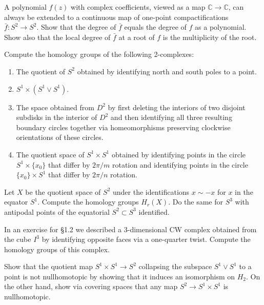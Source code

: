 \begin{exercise}
A polynomial $f(z)$ with complex coefficients, viewed as a map $\mathbb{C} \to \mathbb{C}$, can always be extended to a continuous map of one-point compactifications $\bar{f}:S^2 \to S^2$. Show that the degree of $\bar{f}$ equals the degree of $f$ as a polynomial. Show also that the local degree of $\bar{f}$ at a root of $f$ is the multiplicity of the root.
\end{exercise}

\begin{exercise}
Compute the homology groups of the following 2-complexes:
\begin{enumerate}
\item[(a)] The quotient of $S^2$ obtained by identifying north and south poles to a point.
\item[(b)] $S^1 \times (S^1 \vee S^1)$.
\item[(c)] The space obtained from $D^2$ by first deleting the interiors of two disjoint subdisks in the interior of $D^2$ and then identifying all three resulting boundary circles together via homeomorphisms preserving clockwise orientations of these circles.
\item[(d)] The quotient space of $S^1 \times S^1$ obtained by identifying points in the circle $S^1 \times \{x_0\}$ that differ by $2\pi/m$ rotation and identifying points in the circle $\{x_0\} \times S^1$ that differ by $2\pi/n$ rotation.
\end{enumerate}
\end{exercise}

\begin{exercise}
Let $X$ be the quotient space of $S^2$ under the identifications $x \sim -x$ for $x$ in the equator $S^1$. Compute the homology groups $H_r(X)$. Do the same for $S^3$ with antipodal points of the equatorial $S^2 \subset S^3$ identified.
\end{exercise}

\begin{exercise}
In an exercise for \S 1.2 we described a 3-dimensional CW complex obtained from the cube $I^3$ by identifying opposite faces via a one-quarter twist. Compute the homology groups of this complex.
\end{exercise}

\begin{exercise}
Show that the quotient map $S^1 \times S^1 \to S^2$ collapsing the subspace $S^1 \vee S^1$ to a point is not nullhomotopic by showing that it induces an isomorphism on $H_2$. On the other hand, show via covering spaces that any map $S^2 \to S^1 \times S^1$ is nullhomotopic.
\end{exercise}

